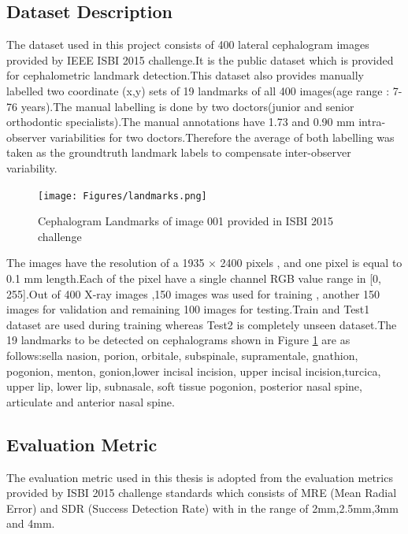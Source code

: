 \documentclass[sn-mathphys]{sn-jnl}%
\theoremstyle{thmstyleone}%
\theoremstyle{thmstyletwo}%
\theoremstyle{thmstylethree}%
\begin{document}
\subsection{Dataset Description}
The dataset used in this project consists of 400 lateral cephalogram images provided by IEEE ISBI 2015 \cite{wang2015evaluation} challenge.It is the public dataset which is provided for cephalometric landmark detection.This dataset  also provides manually labelled two coordinate (x,y) sets of 19 landmarks of all 400 images(age range : 7-76 years).The manual labelling is done by two doctors(junior and senior orthodontic specialists).The manual annotations have 1.73 and 0.90 mm  intra-observer variabilities for two doctors.Therefore the average of both labelling was taken as the groundtruth landmark labels  to compensate inter-observer variability.


\begin{figure}[htp]
    \centering
    \texttt{[image: Figures/landmarks.png]}
    \caption{Cephalogram Landmarks of image 001 provided in ISBI 2015 challenge}
    \label{figure 3.1:landmarks}
\end{figure}



\par The images have the resolution of a 1935 × 2400 pixels , and one pixel is equal to 0.1 mm length.Each of the pixel have a single channel RGB value range in [0, 255].Out of 400 X-ray images ,150 images was used for training , another 150 images for validation and remaining 100 images for testing.Train and Test1 dataset are used during training whereas Test2 is completely unseen dataset.The 19 landmarks to be detected on cephalograms  shown in Figure \ref{figure 3.1:landmarks} are as follows:sella  nasion, porion, orbitale, subspinale, supramentale, gnathion, pogonion, menton, gonion,lower incisal incision, upper incisal incision,turcica, upper lip, lower lip, subnasale, soft tissue pogonion, posterior nasal spine, articulate and anterior nasal spine.

\subsection{Evaluation Metric}
The evaluation metric used in this thesis is adopted from the evaluation metrics provided by ISBI 2015 challenge \cite{wang2015evaluation} standards which consists of MRE (Mean Radial Error) and SDR (Success Detection Rate) with in the range of 2mm,2.5mm,3mm and 4mm.
\end{document}
